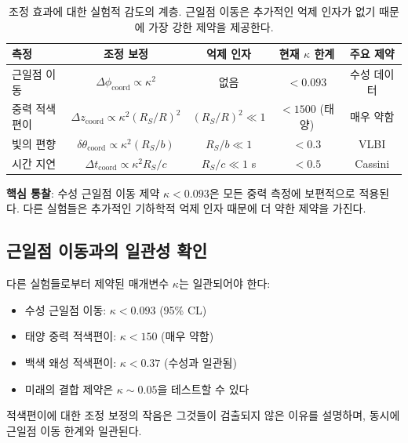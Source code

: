 \documentclass[11pt,a4paper]{article}
\begin{document}
\begin{table}[htbp]
\centering
\scriptsize
\begin{tabular}{lcccc}
	\toprule
	\textbf{측정} & \textbf{조정 보정} & \textbf{억제 인자} & \textbf{현재 $\kappa$ 한계} & \textbf{주요 제약} \\
	\midrule
	근일점 이동 & $\Delta\phi_{\text{coord}} \propto \kappa^2$ & 없음 & $<0.093$ & 수성 데이터 \\
	중력 적색편이 & $\Delta z_{\text{coord}} \propto \kappa^2(R_S/R)^2$ & $(R_S/R)^2 \ll 1$ & $<1500$ (태양) & 매우 약함 \\
	빛의 편향 & $\delta\theta_{\text{coord}} \propto \kappa^2(R_S/b)$ & $R_S/b \ll 1$ & $<0.3$ & VLBI \\
	시간 지연 & $\Delta t_{\text{coord}} \propto \kappa^2 R_S/c$ & $R_S/c \ll 1$ s & $<0.5$ & Cassini \\
	\bottomrule
\end{tabular}
\caption{조정 효과에 대한 실험적 감도의 계층. 근일점 이동은 추가적인 억제 인자가 없기 때문에 가장 강한 제약을 제공한다.}
\label{tab:sensitivity-hierarchy}
\end{table}

\textbf{핵심 통찰}: 수성 근일점 이동 제약 $\kappa < 0.093$은 모든 중력 측정에 보편적으로 적용된다. 다른 실험들은 추가적인 기하학적 억제 인자 때문에 더 약한 제약을 가진다.

\subsection{근일점 이동과의 일관성 확인}

다른 실험들로부터 제약된 매개변수 $\kappa$는 일관되어야 한다:
\begin{itemize}
\item 수성 근일점 이동: $\kappa < 0.093$ (95\% CL)
\item 태양 중력 적색편이: $\kappa < 150$ (매우 약함)
\item 백색 왜성 적색편이: $\kappa < 0.37$ (수성과 일관됨)
\item 미래의 결합 제약은 $\kappa \sim 0.05$을 테스트할 수 있다
\end{itemize}

적색편이에 대한 조정 보정의 작음은 그것들이 검출되지 않은 이유를 설명하며, 동시에 근일점 이동 한계와 일관된다.
\end{document}
